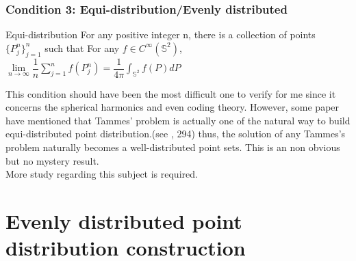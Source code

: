 \documentclass[12pt]{article}
\numberwithin{equation}{section}
\let\bb\mathbb
\newenvironment{general}[2][]{\begin{box_for_gene}[#1]{#2}}{\end{box_for_gene}}
\let\bb\mathbb
\begin{document}
	\newpage
	\section{Condition 3: Equi-distribution/Evenly distributed}
		\begin{general}[c1]{Equi-distribution}
		For any positive integer n, there is a collection of points $\{ P_j^n \}_{j=1}^n$ such that 
		For any $f \in C^{\infty}(\bb{S}^2)$, \\
		$\lim\limits_{n \to \infty} \dfrac{1}{n} \sum_{j=1}^{n} f(P_j^n) = \dfrac{1}{4\pi} \int_{\bb{S}^2} f(P)dP$
		
		
		\end{general}
	
	
	This condition should have been the most difficult one to verify for me since it concerns the spherical harmonics and even coding theory. However, some paper have mentioned that Tammes' problem is actually one of the natural way to build equi-distributed point distribution.(see \cite{brauchart_2015_distributing}, 294) thus, the solution of any Tammes's problem naturally becomes a well-distributed point sets. This is an non obvious but no mystery result.\\
	More study regarding this subject is required.
	
	\vspace{10mm}
	\newpage
	\part{Evenly distributed point distribution construction}
	
	\newpage
\end{document}

